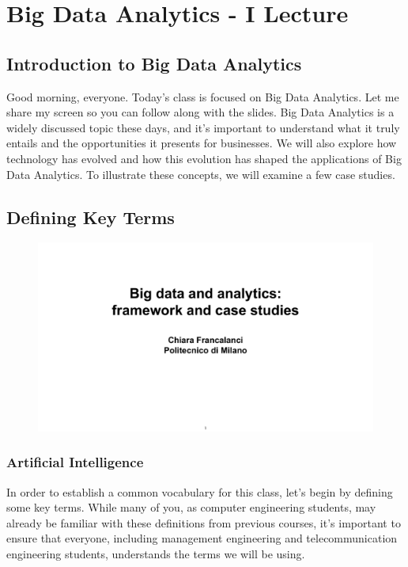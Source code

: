 \section{Big Data Analytics - I Lecture}

\subsection{Introduction to Big Data
    Analytics}\label{introduction-to-big-data-analytics}

Good morning, everyone. Today's class is focused on Big Data Analytics.
Let me share my screen so you can follow along with the slides. Big Data
Analytics is a widely discussed topic these days, and it's important to
understand what it truly entails and the opportunities it presents for
businesses. We will also explore how technology has evolved and how this
evolution has shaped the applications of Big Data Analytics. To
illustrate these concepts, we will examine a few case studies.


\subsection{Defining Key Terms}\label{defining-key-terms}

\begin{figure}[!h]
    \centering
    \includegraphics[page=4, trim = 1.5cm 4cm 1.5cm 4cm, clip, width=\textwidth]{images/06 - BIG_DATA.pdf}
\end{figure}

\subsubsection{Artificial Intelligence}\label{artificial-intelligence}

In order to establish a common vocabulary for this class, let's begin by
defining some key terms. While many of you, as computer engineering
students, may already be familiar with these definitions from previous
courses, it's important to ensure that everyone, including management
engineering and telecommunication engineering students, understands the
terms we will be using.

